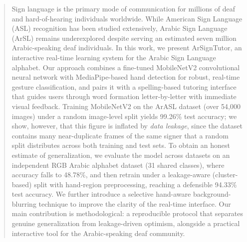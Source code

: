 \begin{abstract}
Sign language is the primary mode of communication for millions of deaf and
hard-of-hearing individuals worldwide. While American Sign Language (ASL)
recognition has been studied extensively, Arabic Sign Language (ArSL) remains
underexplored despite serving an estimated seven million Arabic-speaking deaf
individuals. In this work, we present ArSignTutor, an interactive real-time
learning system for the Arabic Sign Language alphabet. Our approach combines a
fine-tuned MobileNetV2 convolutional neural network with MediaPipe-based hand
detection for robust, real-time gesture classification, and pairs it with a
spelling-based tutoring interface that guides users through word formation
letter-by-letter with immediate visual feedback. Training MobileNetV2 on the
ArASL dataset (over 54{,}000 images) under a random image-level split yields
99.26\% test accuracy; we show, however, that this figure is inflated by
\emph{data leakage}, since the dataset contains many near-duplicate frames of the
same signer that a random split distributes across both training and test sets. To
obtain an honest estimate of generalization, we evaluate the model across datasets
on an independent RGB Arabic alphabet dataset (31 shared classes), where accuracy
falls to 48.78\%, and then retrain under a leakage-aware (cluster-based) split with
hand-region preprocessing, reaching a defensible 94.33\% test accuracy. We further
introduce a selective hand-aware background-blurring technique to improve the
clarity of the real-time interface. Our main contribution is methodological: a
reproducible protocol that separates genuine generalization from leakage-driven
optimism, alongside a practical interactive tool for the Arabic-speaking deaf
community.
\end{abstract}